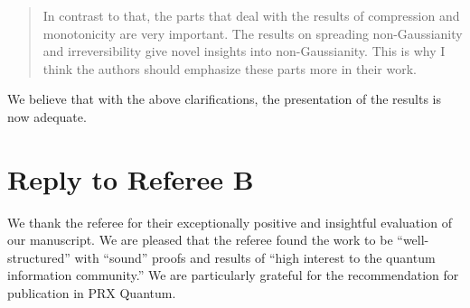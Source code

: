 \documentclass[a4paper,12pt]{article}
\newenvironment{Referee}[1]
{\noindent {\bf Comment #1:} \begin{quote} }
{\end{quote}\vspace{0 cm}}
\newenvironment{Comment}[0]
{\noindent {\bf General Comment:} \begin{quote}}
{\end{quote}\vspace{0 cm}}
\newenvironment{Response}
{\noindent \color{RawSienna}{\bf Response:} }
{\vspace{0.4 cm}}
\begin{document}
\begin{Referee}{9}
In contrast to that, the parts that deal with the results of compression and monotonicity are very important. The results on spreading non-Gaussianity and irreversibility give novel insights into non-Gaussianity. This is why I think the authors should emphasize these parts more in their work.
\end{Referee}

\begin{Response}
    We believe that with the above clarifications, the presentation of the results is now adequate.
\end{Response}

\section{Reply to Referee B}

We thank the referee for their exceptionally positive and insightful evaluation of our manuscript. We are pleased that the referee found the work to be ``well-structured'' with ``sound'' proofs and results of ``high interest to the quantum information community.'' We are particularly grateful for the recommendation for publication in PRX Quantum.
\end{document}

